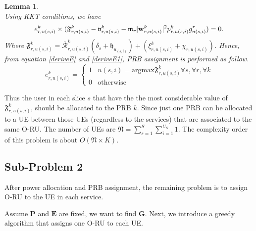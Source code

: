 \documentclass[conference]{IEEEtran}
\newtheorem{lemma}{Lemma}
\begin{document}
\begin{lemma}
\begin{equation}
\end{equation}
Using KKT conditions, we have
\begin{equation}\label{deriveE1}
e_{r,u(s,i)}^{k}\times (\mathfrak{F}^{k}_{r,u(s,i)} -\mathfrak{v}^{k}_{r,u(s,i)} - \mathfrak{m}_{r}|\bold{w}_{r,u(s,i)}^{k}|^2 p_{r,u(s,i)}^{k} g_{u(s,i)}^r ) = 0.
\end{equation}
Where $\mathfrak{F}^{k}_{r,u(s,i)} =\mathcal{\bar{R}}_{r,u(s,i)}^{k}(\delta_s+\mathfrak{h}_{u_{(s,i)}})+( \xi^{k}_{r,u(s,i)} +\chi_{r,u(s,i)}) $.
Hence, from equation \eqref{deriveE} and \eqref{deriveE1}, PRB assignment is performed as follow.
\begin{equation}
e_{r,u(s,i)}^{k} = 
  \begin{cases}
      1 & u(s,i) = \text{argmax} \mathfrak{F}^{k}_{r,u(s,i)} \forall s, \forall r, \forall k\\
      0 & \text{otherwise}
    \end{cases}
\end{equation}
\end{lemma}
Thus the user in each slice $s$ that have the the most considerable value of $\mathfrak{F}^{k}_{r,u(s,i)}$, should be allocated to the PRB $k$. Since just one PRB can be allocated to a UE between those UEs (regardless to the services) that are associated to the same O-RU.
The number of UEs are $\mathfrak{N} = \sum_{s=1}^{S}\sum_{i=1}^{U_S}1$.
The complexity order of this problem is about $O(\mathfrak{N} \times K)$.
\subsection{Sub-Problem 2}\label{sub2}
After power allocation and PRB assignment, the remaining problem is to assign O-RU to the UE in each service.

Assume $\boldsymbol{P}$ and $\boldsymbol{E}$ are fixed, we want to find $\boldsymbol{G}$.
Next, we introduce a greedy algorithm that assigns one O-RU to each UE.
\end{document}
